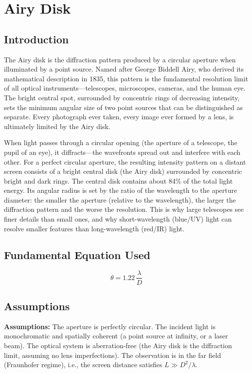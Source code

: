 \chapter{Airy Disk}

\section*{Introduction}

The Airy disk is the diffraction pattern produced by a circular aperture when illuminated by a point source. Named after George Biddell Airy, who derived its mathematical description in 1835, this pattern is the fundamental resolution limit of all optical instruments---telescopes, microscopes, cameras, and the human eye. The bright central spot, surrounded by concentric rings of decreasing intensity, sets the minimum angular size of two point sources that can be distinguished as separate. Every photograph ever taken, every image ever formed by a lens, is ultimately limited by the Airy disk.

When light passes through a circular opening (the aperture of a telescope, the pupil of an eye), it diffracts---the wavefronts spread out and interfere with each other. For a perfect circular aperture, the resulting intensity pattern on a distant screen consists of a bright central disk (the Airy disk) surrounded by concentric bright and dark rings. The central disk contains about 84\% of the total light energy. Its angular radius is set by the ratio of the wavelength to the aperture diameter: the smaller the aperture (relative to the wavelength), the larger the diffraction pattern and the worse the resolution. This is why large telescopes see finer details than small ones, and why short-wavelength (blue/UV) light can resolve smaller features than long-wavelength (red/IR) light.
\section*{Fundamental Equation Used}

\begin{equation}
\theta = 1.22\,\frac{\lambda}{D}
\end{equation}
\section*{Assumptions}

\textbf{Assumptions:} The aperture is perfectly circular. The incident light is monochromatic and spatially coherent (a point source at infinity, or a laser beam). The optical system is aberration-free (the Airy disk is the diffraction limit, assuming no lens imperfections). The observation is in the far field (Fraunhofer regime), i.e., the screen distance satisfies $L \gg D^2/\lambda$.


